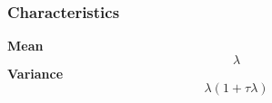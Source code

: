 \subsubsection*{Characteristics}
\smallskip \noindent \hspace{.2cm} \textbf{Mean} 
\begin{equation*}\lambda\end{equation*}
\smallskip \noindent \hspace{.2cm} \textbf{Variance} 
\begin{equation*}\lambda (1 + \tau \lambda)\end{equation*}
\smallskip
%
%
% 
%
%
%
%
%
%
